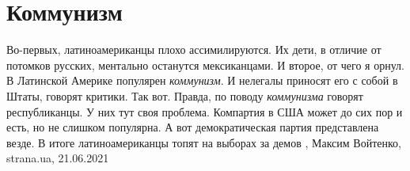  
 
 
 
 
\chapter{Коммунизм}

Во-первых, латиноамериканцы плохо ассимилируются. Их дети, в отличие от
потомков русских, ментально останутся мексиканцами. И второе, от чего я орнул.
В Латинской Америке популярен \emph{коммунизм}. И нелегалы приносят его с собой
в Штаты, говорят критики. Так вот. Правда, по поводу \emph{коммунизма} говорят
республиканцы. У них тут своя проблема. Компартия в США может до сих пор и
есть, но не слишком популярна. А вот демократическая партия представлена везде.
В итоге латиноамериканцы топят на выборах за демов
, 
Максим Войтенко, strana.ua, 21.06.2021


